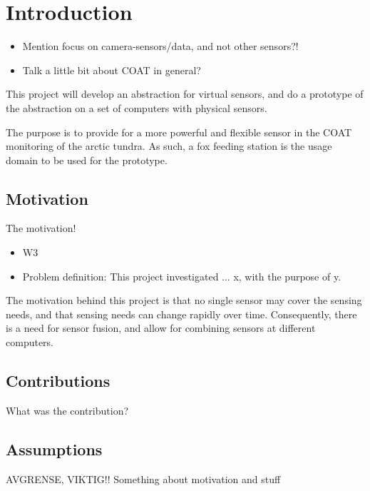 \documentclass[USenglish]{uit-thesis}
\begin{document}
\tableofcontents

\listoffigures

\mainmatter

\chapter{Introduction}
\begin{itemize}
\item Mention focus on camera-sensors/data, and not other sensors?!
\item Talk a little bit about COAT in general?
\end{itemize}

This project will develop an abstraction for virtual sensors, and do a prototype of the abstraction on a set of computers with physical sensors.

The purpose is to provide for a more powerful and flexible sensor in the COAT monitoring of the arctic tundra. As such, a fox feeding station is the usage domain to be used for the prototype.


\section{Motivation}
The motivation!
\begin{itemize}
\item W3
\item Problem definition: This project investigated ... x, with the purpose of y.
\end{itemize}

The motivation  behind this project is that no single sensor may cover the sensing needs, and that sensing needs can change rapidly over time. Consequently, there is a need for sensor fusion, and allow for combining sensors at different computers.

\section{Contributions}
What was the contribution?

\section{Assumptions}
AVGRENSE, VIKTIG!!
Something about motivation and stuff
\end{document}
